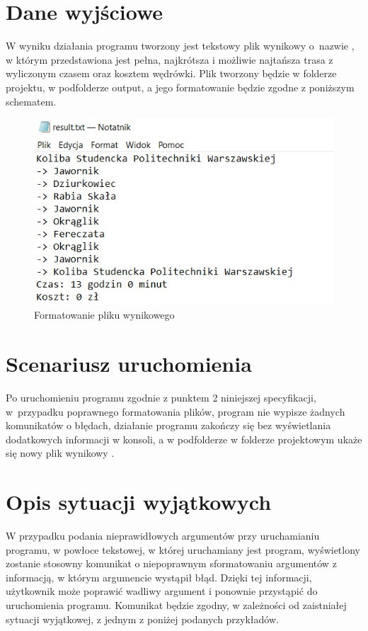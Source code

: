 \documentclass[12pt,a4paper]{article}
\begin{document}
\section{Dane wyjściowe}
W wyniku działania programu tworzony jest tekstowy plik wynikowy o~nazwie , w którym przedstawiona jest pełna, najkrótsza i możliwie najtańsza trasa z wyliczonym czasem oraz kosztem wędrówki. Plik tworzony będzie w folderze projektu, w podfolderze output, a jego formatowanie będzie zgodne z poniższym schematem.\\
\begin{figure}[h!]
\includegraphics[scale = 1]{result.jpg}
\caption{Formatowanie pliku wynikowego}
\end{figure}
\section{Scenariusz uruchomienia}
Po uruchomieniu programu zgodnie z punktem 2 niniejszej specyfikacji, w~przypadku poprawnego formatowania plików, program nie wypisze żadnych komunikatów o błędach, działanie programu zakończy się bez wyświetlania dodatkowych informacji w konsoli, a w podfolderze  w folderze projektowym ukaże się nowy plik wynikowy .
\section{Opis sytuacji wyjątkowych}
W przypadku podania nieprawidłowych argumentów przy uruchamianiu programu, w powłoce tekstowej, w której uruchamiany jest program, wyświetlony zostanie stosowny komunikat o niepoprawnym sformatowaniu argumentów z informacją, w którym argumencie wystąpił błąd. Dzięki tej informacji, użytkownik może poprawić wadliwy argument i ponownie przystąpić do uruchomienia programu. Komunikat będzie zgodny, w zależności od zaistniałej sytuacji wyjątkowej, z jednym z poniżej podanych przykładów.
\end{document}
